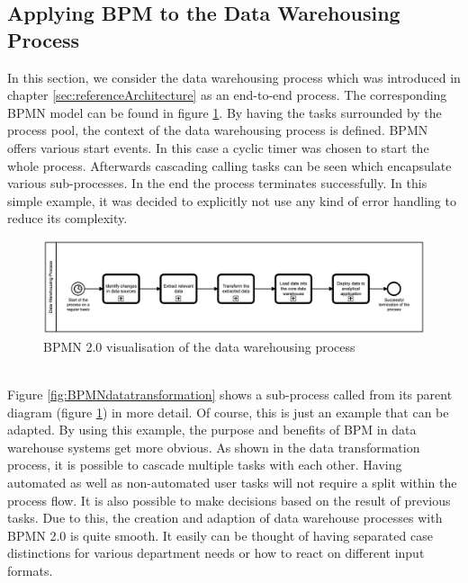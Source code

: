 \subsection{Applying BPM to the Data Warehousing Process}
In this section, we consider the data warehousing process which was introduced in chapter \ref{sec:referenceArchitecture} as an end-to-end process. The corresponding BPMN model can be found in figure \ref{fig:BPMNdatawarehousing}.\newline
By having the tasks surrounded by the process pool, the context of the data warehousing process is defined. BPMN offers various start events. In this case a cyclic timer was chosen to start the whole process. Afterwards cascading calling tasks can be seen which encapsulate various sub-processes. In the end the process terminates successfully. In this simple example, it was decided to explicitly not use any kind of error handling to reduce its complexity.\newline
\begin{figure}[!htb]
    \centering
    \includegraphics[scale=0.15]{pictures/DataWarehousingProcess.png}
    \caption{BPMN 2.0 visualisation of the data warehousing process}
    \label{fig:BPMNdatawarehousing}
\end{figure}\\
Figure \ref{fig:BPMNdatatransformation} shows a sub-process called from its parent diagram (figure \ref{fig:BPMNdatawarehousing}) in more detail. Of course, this is just an example that can be adapted. By using this example, the purpose and benefits of BPM in data warehouse systems get more obvious.\newline
As shown in the data transformation process, it is possible to cascade multiple tasks with each other. Having automated as well as non-automated user tasks will not require a split within the process flow. It is also possible to make decisions based on the result of previous tasks. Due to this, the creation and adaption of data warehouse processes with BPMN 2.0 is quite smooth. It easily can be thought of having separated case distinctions for various department needs or how to react on different input formats.\newline 
